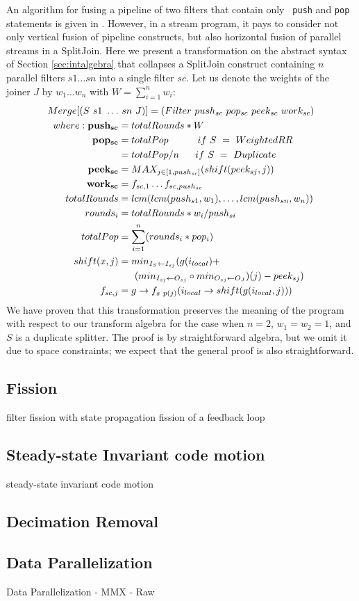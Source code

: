 An algorithm for fusing a pipeline of two filters that contain only {\tt
push} and {\tt pop} statements is given in \cite{pro96}.  However, in a
stream program, it pays to consider not only vertical fusion of pipeline
constructs, but also horizontal fusion of parallel streams in a
SplitJoin.  Here we present a transformation on the abstract syntax of
Section \ref{sec:intalgebra} that collapses a SplitJoin construct
containing $n$ parallel filters $s1 \dots sn$ into a single filter $sc$.
Let us denote the weights of the joiner $J$ by $w_1 \dots w_n$ with $W =
\sum_{i=1}^{n}{w_i}$:
\begin{align*}
Merge[(S~s1~\dots&~sn~J)] = (Filter~push_{sc}~pop_{sc}~peek_{sc}~work_{sc}) \\
where: {\bf push_{sc}} &= totalRounds * W \\
       {\bf pop_{sc}} &= totalPop ~~~~~~~~~if~S~=~WeightedRR \\
                &= totalPop / n ~~~~~if~S~=~Duplicate \\
       {\bf peek_{sc}} &= MAX_{j \in [1,push_{sc}]}(shift(peek_{sj}, j)) \\
       {\bf work_{sc}} &= f_{sc, 1} \dots f_{sc, push_{sc}} \\
       totalRounds &= lcm(lcm(push_{s1}, w_1), \dots, lcm(push_{sn},
       w_n)) \\
       rounds_i &= totalRounds * w_i  / push_{si} \\
       totalPop &= \sum_{i=1}^{n}(rounds_i*pop_i) \\
       shift(x, j) &= min_{I_S \leftarrow I_{sj}}(g(i_{local})+ \\ &~~~~~(min_{I_{sj} \leftarrow O_{sj}} \circ min_{O_{sj} \leftarrow O_J})(j)-peek_{sj}) \\
       f_{sc, j} &= g \rightarrow f_{s~p(j)}(i_{local} \rightarrow shift(g(i_{local}, j)))
\end{align*}
We have proven that this transformation preserves the meaning of the
program with respect to our transform algebra for the case when $n = 2$,
$w_1 = w_2 = 1$, and $S$ is a duplicate splitter.  The proof is by
straightforward algebra, but we omit it due to space constraints; we
expect that the general proof is also straightforward.

\subsection{Fission}

filter fission with state propagation
fission of a feedback loop

\subsection{Steady-state Invariant code motion}

steady-state invariant code motion

\subsection{Decimation Removal}

\subsection{Data Parallelization}

Data Parallelization
-	MMX
-	Raw

